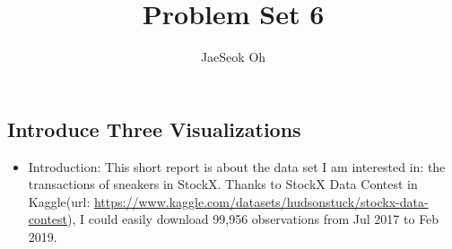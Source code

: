 \documentclass{article}
\title{Problem Set 6}
\author{JaeSeok Oh}
\begin{document}
	\maketitle
	
\begin{large}
\section*{Introduce Three Visualizations}

\begin{itemize}
	\item Introduction: This short report is about the data set I am interested in: the transactions of sneakers in StockX. Thanks to StockX Data Contest in Kaggle(url: \url{https://www.kaggle.com/datasets/hudsonstuck/stockx-data-contest}), I could easily download 99,956 observations from Jul 2017 to Feb 2019.
\end{itemize}


\end{large}
\end{document}
